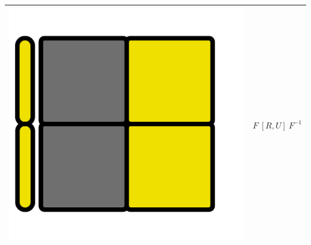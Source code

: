 \documentclass[12pt,a4paper, usenames, dvipsnames]{article}
\theoremstyle{mystyle}
\theoremstyle{definition}
\begin{document}
\begin{center}
\begin{tabular}{m{4cm} m{6cm}}
\includegraphics[scale=0.08]{TOPVIEW4.png} & $F \ [ R,U ] \ F^{-1}$ \\
\bottomrule
\end{tabular}
\end{center}
\end{document}
